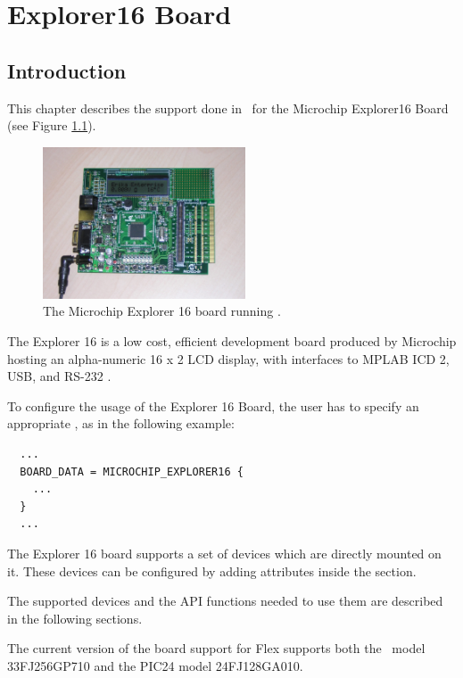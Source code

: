 \chapter[Explorer16 Board]{Explorer16 Board}

\section{Introduction}

This chapter describes the support done in \ee\ for the
Microchip Explorer16 Board (see Figure \ref{fig:explorer16}).

\begin{figure}
  \begin{center}
    \includegraphics[width=6cm, bb=0 0 1600 1200]{images/explorer16running.jpg}
  \end{center}
  \caption{The Microchip Explorer 16 board running \ee.}
  \label{fig:explorer16}
\end{figure}

The Explorer 16 is a low cost, efficient development board produced by
Microchip hosting an alpha-numeric 16 x 2 LCD display, with interfaces
to MPLAB ICD 2, USB, and RS-232 \cite{MicrochipExplorer16}.

To configure the usage of the Explorer 16 Board, the user has to specify an
appropriate , as in the following example:

\begin{lstlisting}
  ...
  BOARD_DATA = MICROCHIP_EXPLORER16 {
    ...
  }
  ...
\end{lstlisting}

The Explorer 16 board supports a set of devices which are directly
mounted on it. These devices can be configured by adding attributes
inside the  section.

The supported devices and the API functions needed to use them are
described in the following sections.

The current version of the board support for Flex supports both the
\dspic\ model 33FJ256GP710 and the PIC24 model 24FJ128GA010.


